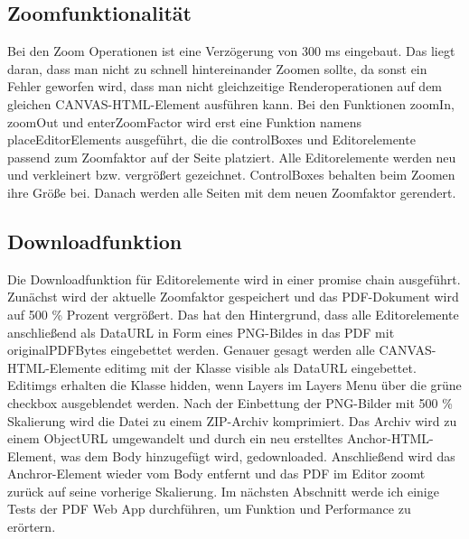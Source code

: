 \subsection{Zoomfunktionalität}
Bei den Zoom Operationen ist eine Verzögerung von 300 ms eingebaut. Das liegt daran, dass man nicht zu schnell hintereinander Zoomen sollte, da sonst ein Fehler geworfen wird, dass man nicht gleichzeitige Renderoperationen auf dem gleichen CANVAS-HTML-Element ausführen kann. Bei den Funktionen zoomIn, zoomOut und enterZoomFactor wird erst eine Funktion namens placeEditorElements ausgeführt, die die controlBoxes und Editorelemente passend zum Zoomfaktor auf der Seite platziert. Alle Editorelemente werden neu und verkleinert bzw. vergrößert gezeichnet. ControlBoxes behalten beim Zoomen ihre Größe bei. Danach werden alle Seiten mit dem neuen Zoomfaktor gerendert.

\subsection{Downloadfunktion}
Die Downloadfunktion für Editorelemente wird in einer promise chain ausgeführt. Zunächst wird der aktuelle Zoomfaktor gespeichert und das PDF-Dokument wird auf 500 \% Prozent vergrößert. Das hat den Hintergrund, dass alle Editorelemente anschließend als DataURL in Form eines PNG-Bildes in das PDF mit originalPDFBytes eingebettet werden. Genauer gesagt werden alle CANVAS-HTML-Elemente editimg mit der Klasse visible als DataURL eingebettet. Editimgs erhalten die Klasse hidden, wenn Layers im Layers Menu über die grüne checkbox ausgeblendet werden. Nach der Einbettung der PNG-Bilder mit 500 \% Skalierung wird die Datei zu einem ZIP-Archiv komprimiert. Das Archiv wird zu einem ObjectURL umgewandelt und durch ein neu erstelltes Anchor-HTML-Element, was dem Body hinzugefügt wird, gedownloaded. Anschließend wird das Anchror-Element wieder vom Body entfernt und das PDF im Editor zoomt zurück auf seine vorherige Skalierung. Im nächsten Abschnitt werde ich einige Tests der PDF Web App durchführen, um Funktion und Performance zu erörtern. 